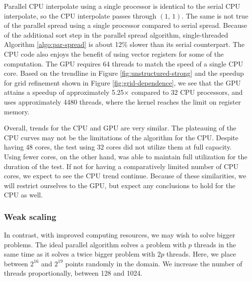 Parallel CPU interpolate using a single processor is identical to the serial
CPU interpolate, so the CPU interpolate passes through $(1,\,1)$. The same is
not true of the parallel spread using a single processor compared to serial
spread. Because of the additional sort step in the parallel spread algorithm,
single-threaded Algorithm \ref{algo:par-spread} is about 12\% slower than its
serial counterpart. The CPU code also enjoys the benefit of using vector
registers for some of the computation. The GPU requires 64 threads to match
the speed of a single CPU core. Based on the trendline in Figure
\ref{fig:unstructured-strong} and the speedup for grid refinement shown in
Figure \ref{fig:grid-dependence}, we see that the GPU attains a speedup of
approximately 5.25$\times$ compared to 32 CPU processors, and uses
approximately 4480 threads, where the kernel reaches the limit on register
memory.


Overall, trends for the CPU and GPU are very similar. The plateauing of the
CPU curves may not be the limitations of the algorithm for the CPU. Despite
having 48 cores, the test using 32 cores did not utilize them at full capacity.
Using fewer cores, on the other hand, was able to maintain full utilization
for the duration of the test. If not for having a comparatively limited number
of CPU cores, we expect to see the CPU trend continue. Because of these
similarities, we will restrict ourselves to the GPU, but expect any conclusions
to hold for the CPU as well.

\subsubsection{Weak scaling}\label{sec:unst-weak}
In contrast, with improved computing resources, we may wish to solve bigger
problems. The ideal parallel algorithm solves a problem with $p$ threads in the
same time as it solves a twice bigger problem with $2p$ threads. Here, we place
between $2^{16}$ and $2^{19}$ points randomly in the domain. We increase the
number of threads proportionally, between 128 and 1024.  

